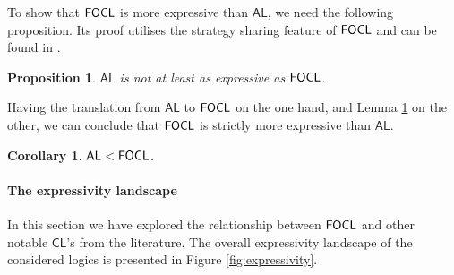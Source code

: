 \documentclass{article}
\newtheorem{proposition}{Proposition}
\newtheorem{corollary}{Corollary}
\begin{document}
To show that $\mathsf{FOCL}$ is more expressive than $\mathsf{AL}$, we need the following proposition. Its proof utilises the strategy sharing feature of $\mathsf{FOCL}$ and can be found in \cite{csl}. %

\begin{proposition}
\label{lemma:exp}
    $\mathsf{AL}$ is not at least as expressive as $\mathsf{FOCL}$.
\end{proposition}
\iffalse
\begin{proof}
    Consider $\exists x \assign{x, x} \lnot p \in \CSL$, and assume towards a contradiction that there is an equivalent $\varphi \in \mathsf{AL}$. Since we have a countably infinite set of constants $\mathcal{C}$ (and hence actions) at our disposal  and due to the fact that $\varphi$ is finite, we can assume that there are actions $a$ and $b$ that do not appear explicitly in $\varphi$. 

Now, consider two concurrent game structures defined over two agents and two actions in Figure \ref{fig::exampleCGM}. As we have already seen in our argument for Proposition \ref{prop:cslVScl}, $\G_1,s \models \exists x \assign{x, x} \lnot p$ and $\G_2,s \not \models \exists x \assign{x, x} \lnot p$. What is left to show is that $\varphi$ cannot distinguish the two structures, i.e. $\G_1,s \models \varphi$ if and only if $\G_2, s \models \varphi$. The proof is by induction on the complexity of $\varphi$, and the details can be found in \cite{csl}. %
\end{proof}
\fi

Having the translation from $\mathsf{AL}$ to $\mathsf{FOCL}$ on the one hand, and Lemma \ref{lemma:exp} on the other, we can conclude that $\mathsf{FOCL}$ is strictly more expressive than $\mathsf{AL}$.

\begin{corollary}
\label{alVScsl}
    $\mathsf{AL} < \mathsf{FOCL}$.
\end{corollary}



\paragraph{The expressivity landscape}
In this section we have explored the relationship between $\mathsf{FOCL}$ and other notable $\mathsf{CL}$'s from the literature. The overall expressivity landscape of the considered logics is presented in Figure \ref{fig:expressivity}.
\end{document}
